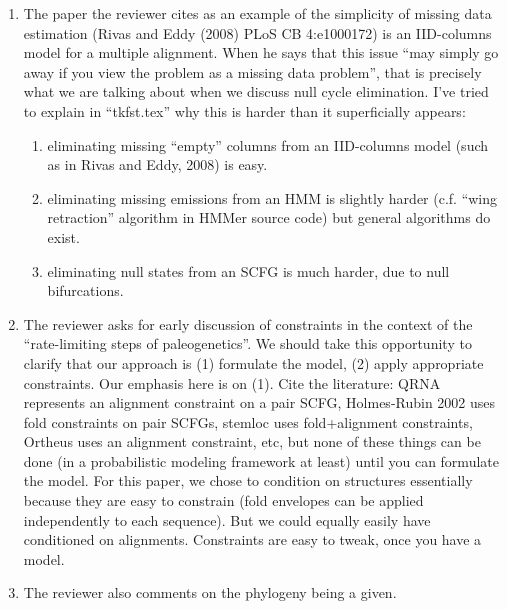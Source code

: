 {\begin{enumerate}
In particular, the CYK algorithm is currently summarized by statements along the lines of
``replace sums over paths through the model (or equivalently, parses) with the $\max()$ operation (e.g., in equation X, sum-over-complicated-expression will be replaced with max-over-complicated-expression)''.
It shouldn't be too hard to write a latex command/macro that can be used (with ``$\sum$'' or ``$\max$'' as an argument) to generate complete versions of {\em both} algorithms.
%
\item The paper the reviewer cites as an example of the simplicity of missing data estimation (Rivas and Eddy (2008) PLoS CB 4:e1000172) is an IID-columns model for a multiple alignment.
When he says that this issue ``may simply go away if you view the problem as a missing data problem'',
that is precisely what we are talking about when we discuss null cycle elimination.
I've tried to explain in ``tkfst.tex'' why this is harder than it superficially appears:
\begin{enumerate}
\item eliminating missing ``empty'' columns from an IID-columns model (such as in Rivas and Eddy, 2008) is easy.
\item eliminating missing emissions from an HMM is slightly harder (c.f. ``wing retraction'' algorithm in HMMer source code)
but general algorithms do exist.
\item eliminating null states from an SCFG is much harder, due to null bifurcations.
\end{enumerate}
%
\item The reviewer asks for early discussion of constraints in the context of the ``rate-limiting steps of paleogenetics''.
We should take this opportunity to clarify that our approach is (1) formulate the model,  (2) apply appropriate constraints.
Our emphasis here is on (1).
Cite the literature: QRNA represents an alignment constraint on a pair SCFG, Holmes-Rubin 2002 uses fold constraints on pair SCFGs,
stemloc uses fold+alignment constraints, Ortheus uses an alignment constraint, etc, but none of these things can be done
(in a probabilistic modeling framework at least) until you can formulate the model.
For this paper, we chose to condition on structures essentially because they are easy to constrain
(fold envelopes can be applied independently to each sequence).
But we could equally easily have conditioned on alignments. Constraints are easy to tweak, once you have a model.
%
\item The reviewer also comments on the phylogeny being a given.

\end{enumerate}}

